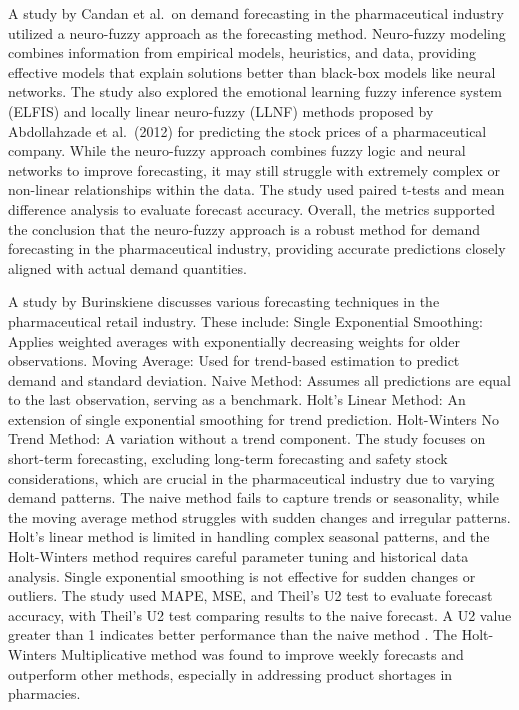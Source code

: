 \documentclass[
  authoryear,
  preprint,
  3p]{elsarticle}
\begin{document}
A study by Candan et al.~on demand forecasting in the pharmaceutical
industry utilized a neuro-fuzzy approach as the forecasting
method\citep[hrupelj2017demand]{inproceedings}. Neuro-fuzzy modeling
combines information from empirical models, heuristics, and data,
providing effective models that explain solutions better than black-box
models like neural networks\citep{abraham2001neuro, babuvska2003neuro}.
The study also explored the emotional learning fuzzy inference system
(ELFIS) and locally linear neuro-fuzzy (LLNF) methods proposed by
Abdollahzade et al.~(2012) for predicting the stock prices of a
pharmaceutical
company\citep{abdollahzade2012application, hrupelj2017demand}. While the
neuro-fuzzy approach combines fuzzy logic and neural networks to improve
forecasting, it may still struggle with extremely complex or non-linear
relationships within the data. The study used paired t-tests and mean
difference analysis to evaluate forecast accuracy. Overall, the metrics
supported the conclusion that the neuro-fuzzy approach is a robust
method for demand forecasting in the pharmaceutical industry, providing
accurate predictions closely aligned with actual demand quantities.

A study by Burinskiene discusses various forecasting techniques in the
pharmaceutical retail industry. These include: Single Exponential
Smoothing: Applies weighted averages with exponentially decreasing
weights for older observations. Moving Average: Used for trend-based
estimation to predict demand and standard deviation. Naive Method:
Assumes all predictions are equal to the last observation, serving as a
benchmark. Holt's Linear Method: An extension of single exponential
smoothing for trend prediction. Holt-Winters No Trend Method: A
variation without a trend component\citep{burinskiene2022forecasting}.
The study focuses on short-term forecasting, excluding long-term
forecasting and safety stock considerations, which are crucial in the
pharmaceutical industry due to varying demand
patterns\citep{nikolopoulos2016forecasting}. The naive method fails to
capture trends or seasonality, while the moving average method struggles
with sudden changes and irregular patterns\citep{restyana2021analysis}.
Holt's linear method is limited in handling complex seasonal patterns,
and the Holt-Winters method requires careful parameter tuning and
historical data analysis\citep{koehler2001forecasting}. Single
exponential smoothing is not effective for sudden changes or
outliers\citep[zahra2019forecasting]{inproceedings}. The study used
MAPE, MSE, and Theil's U2 test to evaluate forecast accuracy, with
Theil's U2 test comparing results to the naive forecast. A U2 value
greater than 1 indicates better performance than the naive method
\citep{burinskiene2022forecasting}. The Holt-Winters Multiplicative
method was found to improve weekly forecasts and outperform other
methods, especially in addressing product shortages in pharmacies.
\end{document}
